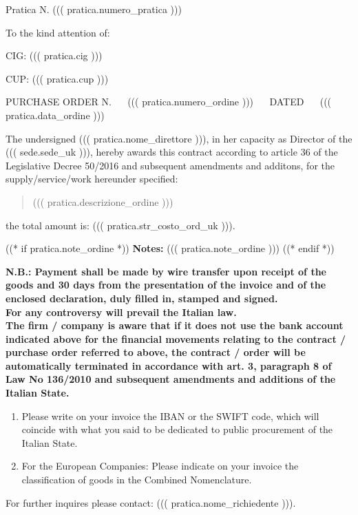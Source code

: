 \documentclass[a4paper,12pt]{letter}
\begin{document}
\topaddr

{\small Pratica N. ((( pratica.numero_pratica ))) }
\vspace{.4cm}

\begin{flushright}
\begin{minipage}{15cm}
To the kind attention of:\\
\end{minipage}
\end{flushright}
\vspace{5mm}

CIG: ((( pratica.cig ))) 

CUP: ((( pratica.cup )))

PURCHASE ORDER N. ~~ ((( pratica.numero_ordine ))) ~~ DATED ~~ ((( pratica.data_ordine )))

The undersigned ((( pratica.nome_direttore ))), in her capacity as Director of the ((( sede.sede_uk ))), hereby
awards this contract according to 
article 36 of the Legislative Decree 50/2016
and subsequent amendments and additons,
for the supply/service/work hereunder specified:

\begin{quote}
((( pratica.descrizione_ordine )))
\end{quote}

the total amount is:   
((( pratica.str_costo_ord_uk ))).

((* if pratica.note_ordine *))
{\bf Notes:} ((( pratica.note_ordine )))
((* endif *))
\vspace{1cm}

{\tiny\bf N.B.:
Payment shall be made by wire transfer upon receipt of the goods and 30 days from the presentation of the invoice
and of the enclosed declaration, duly filled in, stamped and signed. \\
For any controversy will prevail the Italian law. \\
The firm / company is aware that if it does not use the bank account indicated above for the financial movements
relating to the contract / purchase order referred to above, the contract / order will be automatically terminated in
accordance with art. 3, paragraph 8 of Law No 136/2010 and subsequent amendments and additions of the Italian
State.
\begin{enumerate}
\item  Please write on your invoice the IBAN or the SWIFT code, which will coincide with what you said to be
dedicated to public procurement of the Italian State.
\item  For the European Companies: Please indicate on your invoice the classification of goods in the Combined
Nomenclature.
\end{enumerate}

For further inquires please contact: ((( pratica.nome_richiedente ))).
}
\end{document}
